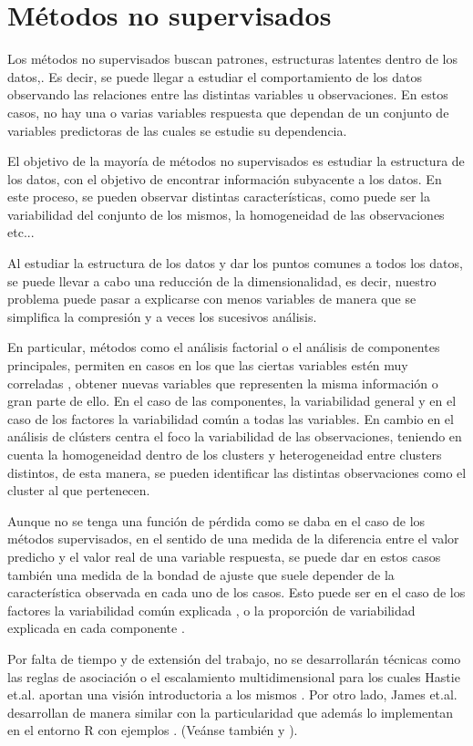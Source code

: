 \chapter{Métodos no supervisados}

\noindent Los métodos no  supervisados buscan  patrones, estructuras latentes dentro de los datos,. Es decir, se puede llegar a estudiar el comportamiento de los datos observando las relaciones entre las distintas variables u observaciones.  En estos casos, no hay una o varias  variables respuesta que dependan de un conjunto de variables predictoras de las cuales se estudie su dependencia.    

\noindent El objetivo de la mayoría de métodos no supervisados es estudiar la estructura de los datos, con el objetivo de encontrar información subyacente a los datos. En este proceso, se pueden observar distintas características, como puede ser la variabilidad del conjunto de los mismos, la homogeneidad de las observaciones etc...

\noindent Al estudiar la estructura de los datos y dar los puntos comunes a todos los datos, se puede llevar a cabo una reducción de la dimensionalidad, es decir, nuestro problema puede pasar a explicarse con menos variables de manera que se simplifica la compresión \cite{Abdi 2010} y a veces los sucesivos análisis. 

\noindent En particular, métodos como el análisis factorial o el análisis de componentes principales, permiten en casos en los que las ciertas variables estén muy correladas \cite{Everitt 2011}, obtener  nuevas variables que representen la misma información o gran parte de ello. En el caso de las componentes, la variabilidad general y en el caso de los factores la variabilidad común a todas las variables. En cambio en el análisis de clústers centra el foco la variabilidad de las observaciones, teniendo en cuenta la homogeneidad dentro de los clusters y heterogeneidad entre clusters distintos, de esta manera, se pueden identificar las distintas observaciones como el cluster al que pertenecen. 

\noindent Aunque no se tenga una función de pérdida como se daba en el caso de los métodos supervisados, en el sentido de una medida de la diferencia entre el valor predicho y el valor real de una variable respuesta, se puede dar en estos casos también una medida de la bondad de ajuste que suele depender de la característica observada en cada uno de los casos. Esto puede ser en el caso de los factores la variabilidad común explicada \cite{Peña 2002}, o la proporción de variabilidad explicada en cada componente \cite{Chatfield 1989}. 

\noindent Por falta de tiempo y de extensión del trabajo, no se desarrollarán técnicas como las reglas de asociación o el escalamiento multidimensional para los cuales Hastie et.al. aportan una visión introductoria a los mismos \cite{Hastie 2001}. Por otro lado, James et.al. desarrollan de manera similar con la particularidad  que además lo implementan en el entorno R con ejemplos \cite{James 2013} . (Veánse también \cite{Everitt 2011} y \cite{Johnson 2007}).

  


\newpage 

\newpage
